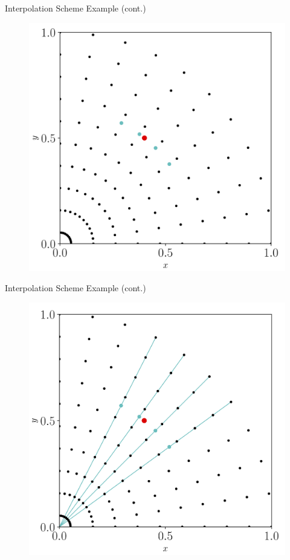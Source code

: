\documentclass{beamer}
\begin{document}
\begin{frame}{Interpolation Scheme Example (cont.)}
	\begin{figure}[H]
		\centering
		\includegraphics[scale=0.5]{figures/Interp2.png}
	\end{figure}
\end{frame}

\begin{frame}{Interpolation Scheme Example (cont.)}
	\begin{figure}[H]
		\centering
		\includegraphics[scale=0.5]{figures/Interp3.png}
	\end{figure}
\end{frame}
\end{document}
